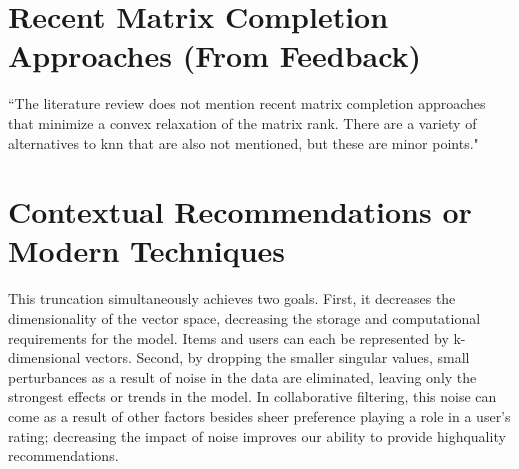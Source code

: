 




\section{Recent Matrix Completion Approaches (From Feedback)}
``The literature review does not mention recent matrix completion approaches that minimize a convex relaxation of the matrix rank. There are a variety of alternatives to knn that are also not mentioned, but these are minor points."

\section{Contextual Recommendations or Modern Techniques}

This truncation simultaneously achieves two goals. First, it decreases the dimensionality of the vector space, decreasing the storage
and computational requirements for the model. Items and users can each be represented by k-dimensional vectors. Second, by dropping
the smaller singular values, small perturbances as a result of noise in the data are eliminated, leaving only the strongest effects or trends in the model. In collaborative filtering, this noise can come as a result of other factors besides sheer preference playing a role in a user’s rating;
decreasing the impact of noise improves our ability to provide highquality
recommendations.

